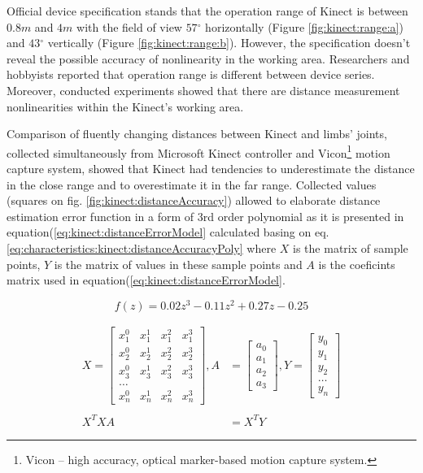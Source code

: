\documentclass[sensors,article,submit,moreauthors,pdftex,10pt,a4paper]{mdpi}
\newcommand{\degree}{\ensuremath{{}^{\circ}}\xspace}
\begin{document}
Official device specification stands that the operation range of Kinect is between $0.8m$ and $4m$ with the field of view $57\degree$ horizontally (Figure \ref{fig:kinect:range:a}) and $43\degree$ vertically (Figure \ref{fig:kinect:range:b}). However, the specification doesn't reveal the possible accuracy of nonlinearity in the working area. Researchers \cite{DiFilippo2015} and hobbyists \cite{stack:kinect2011} reported that operation range is different between device series. Moreover, conducted experiments showed that there are distance measurement nonlinearities within the Kinect’s working area.

Comparison of fluently changing distances between Kinect and limbs' joints, collected simultaneously from Microsoft Kinect controller and Vicon\footnote{Vicon -- high accuracy, optical marker-based motion capture system.} motion capture system, showed that Kinect had tendencies to underestimate the distance in the close range and to overestimate it in the far range. Collected values (squares on fig. \ref{fig:kinect:distanceAccuracy}) allowed to elaborate distance estimation error function in a form of 3rd order polynomial as it is presented in equation(\ref{eq:kinect:distanceErrorModel} calculated basing on eq. \ref{eq:characteristics:kinect:distanceAccuracyPoly} where $X$ is the matrix of sample points, $Y$ is the matrix of values in these sample points and $A$ is the coeficints matrix used in equation(\ref{eq:kinect:distanceErrorModel}. 

\begin{equation}
	f(z)=0.02z^3-0.11z^2+0.27z-0.25 
	\label{eq:kinect:distanceErrorModel}
\end{equation}

\begin{equation}
\begin{split}
X = 	\begin{bmatrix}
x_1^0&x_1^1&x_1^2&x_1^3\\
x_2^0&x_2^1&x_2^2&x_2^3\\
x_3^0&x_3^1&x_3^2&x_3^3\\
\dots\\
x_n^0&x_n^1&x_n^2&x_n^3
\end{bmatrix} ,
A &= 	\begin{bmatrix}
a_0\\a_1\\a_2\\a_3
\end{bmatrix} ,
Y = 
\begin{bmatrix}
y_0 \\y_1\\y_2\\\dots\\y_n
\end{bmatrix} \\
& \\
X^TXA &= X^TY
\end{split}
\label{eq:characteristics:kinect:distanceAccuracyPoly}
\end{equation}
\end{document}
